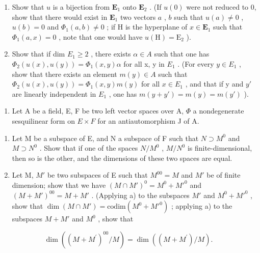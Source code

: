 \begin{enumerate}
\def\labelenumi{\alph{enumi})}
\item
  Show that \(u\) is a bijection from \(\mathbf{E}_{1}\) onto \(\mathbf{E}_{2}\) . (If \(u(0)\) were not reduced to 0, show that there would exist in \(\mathbf{E}_{1}\) two vectors \(a\) , \(b\) such that \(u(a) \neq 0\) , \(u(b) = 0\) and \(\Phi_{1}(a, b) \neq 0\) ; if H is the hyperplane of \(x \in \mathbf{E}_{1}\) such that \(\Phi_{1}(a, x) = 0\) , note that one would have \(u(\mathrm{H}) = \mathrm{E}_{2}\) ).
\item
  Show that if dim \(E_{1} \geqslant 2\) , there exists \(\alpha \in A\) such that one has \(\Phi_{2}(u(x), u(y)) = \Phi_{1}(x, y) \alpha\) for all x, y in \(E_{1}\) . (For every \(y \in E_{1}\) , show that there exists an element \(m(y) \in A\) such that \(\Phi_{2}(u(x), u(y)) = \Phi_{1}(x, y)m(y)\) for all \(x \in E_{1}\) , and that if y and \(y'\) are linearly independent in \(E_{1}\) , one has \(m(y + y') = m(y) = m(y')\) ).
\end{enumerate}

\begin{enumerate}
\def\labelenumi{\arabic{enumi})}
\setcounter{enumi}{8}
\tightlist
\item
  Let A be a field, E, F be two left vector spaces over A, \(\Phi\) a nondegenerate sesquilinear form on \(E \times F\) for an antiautomorphism J of A.
\end{enumerate}

\begin{enumerate}
\def\labelenumi{\alph{enumi})}
\item
  Let M be a subspace of E, and N a subspace of F such that \(N \supset M^{0}\) and \(M \supset N^{0}\) . Show that if one of the spaces \(N/M^{0}\) , \(M/N^{0}\) is finite-dimensional, then so is the other, and the dimensions of these two spaces are equal.
\item
  Let M, \(M'\) be two subspaces of E such that \(M^{00} = M\) and \(M'\) be of finite dimension; show that we have \((M \cap M')^{0} = M^{0} + M'^{0}\) and \((M + M')^{00} = M + M'\) . (Applying a) to the subspaces \(M'\) and \(M^{0} + M'^{0}\) , show that \(\dim(M \cap M') = \text{codim}(M^{0} + M'^{0})\) ; applying a) to the subspaces \(M + M'\) and \(M^{0}\) , show that
\end{enumerate}

\[
\dim ((M + M ^ {\prime}) ^ {0 0} / M) = \dim ((M + M ^ {\prime}) / M).
\]

